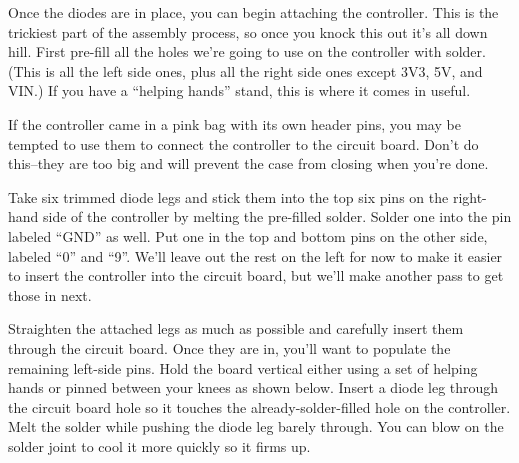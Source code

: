 \documentclass{article}
\begin{document}
Once the diodes are in place, you can begin attaching the
controller. This is the trickiest part of the assembly process, so
once you knock this out it's all down hill. First pre-fill all the
holes we're going to use on the controller with solder. (This is all
the left side ones, plus all the right side ones except 3V3, 5V, and
VIN.) If you have a ``helping hands'' stand, this is where it comes in
useful.

\vspace{1em}

If the controller came in a pink bag with its own header pins, you may
be tempted to use them to connect the controller to the circuit
board. Don't do this--they are too big and will prevent the case from
closing when you're done.

\vspace{1em}

Take six trimmed diode legs and stick them into the top six pins on
the right-hand side of the controller by melting the pre-filled
solder. Solder one into the pin labeled ``GND'' as well. Put one in
the top and bottom pins on the other side, labeled ``0'' and
``9''. We'll leave out the rest on the left for now to make
it easier to insert the controller into the circuit board, but we'll
make another pass to get those in next.

\vspace{1em}
\noindent{}
\vspace{1em}

Straighten the attached legs as much as possible and carefully insert
them through the circuit board. Once they are in, you'll want to
populate the remaining left-side pins. Hold the board vertical either
using a set of helping hands or pinned between your knees as shown
below. Insert a diode leg through the circuit board hole so it touches
the already-solder-filled hole on the controller. Melt the solder
while pushing the diode leg barely through. You can blow on the solder
joint to cool it more quickly so it firms up.
\end{document}
